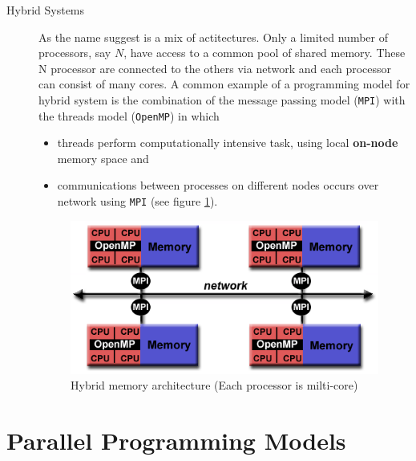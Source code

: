 \begin{description}
\begin{description}
	\item[Hybrid Systems] As the name suggest is a mix of actitectures. Only a limited number of  processors, say $N$, have	access to a common pool of shared memory. These N processor are connected to the others via network and each processor can consist of many cores.
	A common example of a  programming model for hybrid system is the combination 	of the message passing model (\texttt{MPI}) with the threads model (\texttt{OpenMP}) in which
	\begin{itemize}
		\item threads perform computationally intensive task, using local
		\textbf{on-node} memory space and
		\item communications between processes on different nodes occurs over network using \texttt{MPI} (see figure \ref{fig:hybridMemory}).
	\end{itemize} 
\begin{figure}
	\centering
	\includegraphics[width=1.0\textwidth]{./images/parallel_programming/hybrid_model}
	\caption{Hybrid memory architecture (Each processor is milti-core)}
	\label{fig:hybridMemory}
\end{figure}
	
\end{description} 
\end{description}

\section{Parallel Programming Models}
